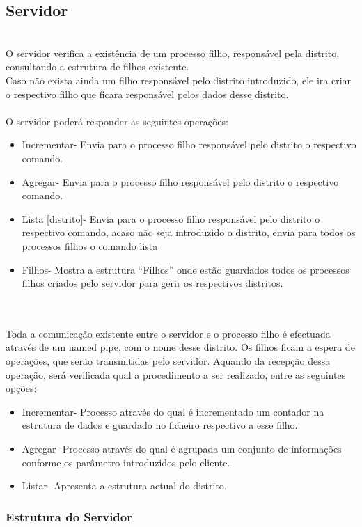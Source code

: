 \documentclass[10pt,notitlepage]{article}
\begin{document}
\subsection{Servidor}
~\\
O servidor verifica a existência de um processo filho, responsável pela distrito, consultando a estrutura de filhos existente.\\
Caso não exista ainda um filho responsável pelo distrito introduzido, ele ira criar o respectivo filho que ficara responsável pelos dados desse distrito.
~\\~\\
O servidor poderá responder as seguintes operações:
\begin{itemize}
\item Incrementar- Envia para o processo filho responsável pelo distrito o respectivo comando.
\item Agregar- Envia para o processo filho responsável pelo distrito o respectivo comando.
\item Lista [distrito]- Envia para o processo filho responsável pelo distrito o respectivo comando, acaso não seja introduzido o distrito, envia para todos os processos filhos o comando lista
\item Filhos- Mostra a estrutura “Filhos” onde estão guardados todos os processos filhos criados pelo servidor para gerir os respectivos distritos.
\end{itemize}
~\\~\\
Toda a comunicação existente entre o servidor e o processo filho é efectuada através de um named pipe, com o nome desse distrito.
Os filhos ficam a espera de operações, que serão transmitidas pelo servidor.
Aquando da recepção dessa operação, será verificada qual a procedimento a ser realizado, entre as seguintes opções:
\begin{itemize}
\item Incrementar- Processo através do qual é incrementado um contador na estrutura de dados e guardado no ficheiro respectivo a esse filho.
\item Agregar- Processo através do qual é agrupada um conjunto de informações conforme os parâmetro introduzidos pelo cliente.
\item Listar- Apresenta a estrutura actual do distrito.
\end{itemize}



\newpage
\subsubsection{Estrutura do Servidor}
\end{document}
